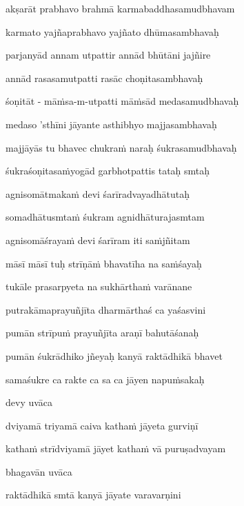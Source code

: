 akṣarāt prabhavo brahmā karmabaddhasamudbhavam\thinspace{\dandab} \dontdisplaylinenum

karmato yajñaprabhavo yajñato dhūmasambhavaḥ \veg\dontdisplaylinenum

parjanyād annam utpattir annād bhūtāni jajñire\thinspace{\dandab} \dontdisplaylinenum

annād rasasamutpatti rasāc choṇitasambhavaḥ \veg\dontdisplaylinenum

śoṇitāt - māṁsa-m-utpatti māṁsād medasamudbhavaḥ\thinspace{\dandab} \dontdisplaylinenum

medaso 'sthīni jāyante asthibhyo majjasambhavaḥ \veg\dontdisplaylinenum

majjāyās tu bhavec chukraṁ naraḥ śukrasamudbhavaḥ\thinspace{\dandab} \dontdisplaylinenum

śukraśoṇitasaṁyogād garbhotpattis tataḥ smtaḥ \veg\dontdisplaylinenum

agnisomātmakaṁ devi śarīradvayadhātutaḥ\thinspace{\dandab} \dontdisplaylinenum

somadhātusmtaṁ śukram agnidhāturajasmtam \danda\dontdisplaylinenum

agnisomāśrayaṁ devi śarīram iti saṁjñitam \veg\dontdisplaylinenum

māsī māsī tuḥ strīṇāṁ bhavatīha na saṁśayaḥ\thinspace{\dandab} \dontdisplaylinenum

tukāle prasarpyeta na sukhārthaṁ varānane \veg\dontdisplaylinenum

putrakāmaprayuñjīta dharmārthaś ca yaśasvini\thinspace{\dandab} \dontdisplaylinenum

pumān strīpuṁ prayuñjīta araṇī bahutāśanaḥ \veg\dontdisplaylinenum

pumān śukrādhiko jñeyaḥ kanyā raktādhikā bhavet\thinspace{\dandab} \dontdisplaylinenum

samaśukre ca rakte ca sa ca jāyen napuṁsakaḥ \veg\dontdisplaylinenum


devy uvāca~{\dandab}\dontdisplaylinenum 

dviyamā triyamā caiva kathaṁ jāyeta gurviṇī\thinspace{\danda} \dontdisplaylinenum

kathaṁ strīdviyamā jāyet kathaṁ vā puruṣadvayam \veg\dontdisplaylinenum

bhagavān uvāca~{\dandab}\dontdisplaylinenum 

raktādhikā smtā kanyā jāyate varavarṇini\thinspace{\danda} \dontdisplaylinenum

